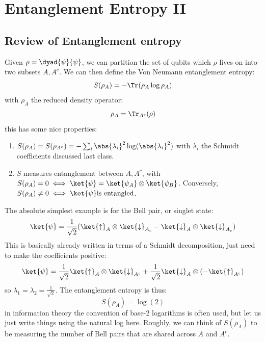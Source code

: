 \section{Entanglement Entropy II}

\subsection{Review of Entanglement entropy}
Given $\rho = \dyad{\psi}{\psi}$, we can partition the set of qubits which $\rho$ lives on into two subsets $A, A^c$. We can then define the Von Neumann entanglement entropy:
\begin{equation}
    S(\rho_A) = -\Tr(\rho_A\log \rho_A)
\end{equation}
with $\rho_A$ the reduced density operator:
\begin{equation}
    \rho_A = \Tr_{A^c}(\rho)
\end{equation}
this has some nice properties:
\begin{enumerate}
    \item $S(\rho_A) = S(\rho_{A^c}) = -\sum_i \abs{\lambda_i}^2\log(\abs{\lambda_i}^2)$ with $\lambda_i$ the Schmidt coefficients discussed last class.
    \item $S$ measures entanglement between $A, A^c$, with $S(\rho_A) = 0 \iff \ket{\psi} = \ket{\psi_A} \otimes \ket{\psi_B}$. Conversely, $S(\rho_A) \neq 0 \iff \ket{\psi} \text{is entangled}$.
\end{enumerate}

The absolute simplest example is for the Bell pair, or singlet state:
\begin{equation}
    \ket{\psi} = \frac{1}{\sqrt{2}}(\ket{\uparrow}_A\otimes \ket{\downarrow}_{A_c} - \ket{\downarrow}_A \otimes \ket{\downarrow}_{A_c})
\end{equation}
This is basically already written in terms of a Schmidt decomposition, just need to make the coefficients positive:
\begin{equation}
    \ket{\psi} = \frac{1}{\sqrt{2}}\ket{\uparrow}_A \otimes \ket{\downarrow}_{A^c} + \frac{1}{\sqrt{2}}\ket{\downarrow}_A \otimes (-\ket{\uparrow}_{A^c})
\end{equation}
so $\lambda_1 = \lambda_2 = \frac{1}{\sqrt{2}}$. The entanglement entropy is thus:
\begin{equation}
    S(\rho_A) = \log(2)
\end{equation}
in information theory the convention of base-2 logarithms is often used, but let us just write things using the natural log here. Roughly, we can think of $S(\rho_A)$ to be measuring the number of Bell pairs that are shared across $A$ and $A^c$.

